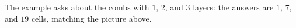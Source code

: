 The example asks about the combs with $1$, $2$, and $3$ layers: the answers are $1$, $7$, and $19$ cells, matching the picture above.
